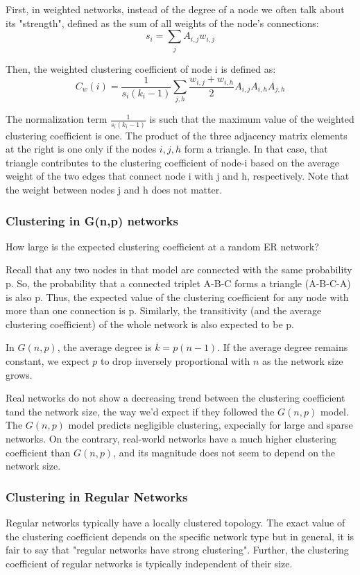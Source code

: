 \documentclass[11pt]{scrartcl} %
\begin{document}
First, in weighted networks, instead of the degree of a node we often talk about its "strength", defined as the sum of all weights of the node's connections:
\[s_i = \sum_j A_{i,j}w_{i,j}\]

Then, the weighted clustering coefficient of node i is defined as:
\[C_w (i) = \frac{1}{s_i (k_i - 1)} \sum_{j,h} \frac{w_{i,j} + w_{i,h}}{2} A_{i,j} A_{i,h} A_{j,h} \]

The normalization term $\frac{1}{s_i (k_i - 1)}$ is such that the maximum value of the weighted clustering coefficient is one. The product of the three adjacency matrix elements at the right is one only if the nodes $i,j,h$ form a triangle. In that case, that triangle contributes to the clustering coefficient of node-i based on the average weight of the two edges that connect node i with j and h, respectively. Note that the weight between nodes j and h does not matter.

\subsubsection{Clustering in G(n,p) networks}
How large is the expected clustering coefficient at a random ER network?

Recall that any two nodes in that model are connected with the same probability p. So, the probability that a connected triplet A-B-C forms a triangle (A-B-C-A) is also p. Thus, the expected value of the clustering coefficient for any node with more than one connection is p. Similarly, the transitivity (and the average clustering coefficient) of the whole network is also expected to be p.

In $G(n,p)$, the average degree is $\overline{k} = p (n-1)$. If the average degree remains constant, we expect $p$ to drop inversely proportional with $n$ as the network size grows.

Real networks do not show a decreasing trend between the clustering coefficient tand the network size, the way we'd expect if they followed the $G(n,p)$ model. The $G(n,p)$ model predicts negligible clustering, expecially for large and sparse networks. On the contrary, real-world networks have a much higher clustering coefficient than $G(n,p)$, and its magnitude does not seem to depend on the network size.

\subsubsection{Clustering in Regular Networks}
Regular networks typically have a locally clustered topology. The exact value of the clustering coefficient depends on the specific network type but in general, it is fair to say that "regular networks have strong clustering". Further, the clustering coefficient of regular networks is typically independent of their size.
\end{document}
